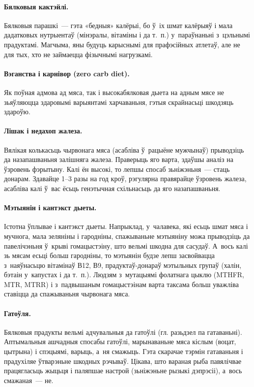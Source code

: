 
\paragraph{Бялковыя кактэйлі.}
Бялковыя парашкі~--- гэта «бедныя» калёрыі, бо ў~іх шмат калёрыяў і мала дадатковых нутрыентаў (мінэралы, вітаміны і да т.~п.) у~параўнаньні з~цэльнымі прадуктамі. Магчыма, яны будуць карыснымі для прафэсійных атлетаў, але не для тых, хто не займаецца фізычнымі нагрузкамі.

\paragraph{Вэганства і карнівор (zero carb diet).}
Як поўная адмова ад мяса, так і высокабялковая дыета на адным мясе не зьяўляюцца здаровымі варыянтамі харчаваньня, гэтыя скрайнасьці шкодзяць здароўю.

\paragraph{Лішак і недахоп жалеза.}
Вялікая колькасьць чырвонага мяса (асабліва ў~рацыёне мужчынаў) прыводзіць да назапашваньня залішняга жалеза. Праверыць яго варта, здаўшы аналіз на ўзровень фэрытыну. Калі ён высокі, то лепшы спосаб зьніжэньня~--- стаць донарам. Здавайце 1--3 разы на год кроў, рэгулярна правярайце ўзровень жалеза, асабліва калі ў~вас ёсьць генэтычная схільнасьць да яго назапашваньня.

\paragraph{Мэтыянін і кантэкст дыеты.}
Істотна ўплывае і кантэкст дыеты. Напрыклад, у~чалавека, які есьць шмат мяса і мучнога, мала зеляніны і гародніны, спажываньне мэтыяніну можа прыводзіць да павелічэньня ў~крыві гомацыстэіну, што вельмі шкодна для сасудаў. А~вось калі зь мясам есьці больш гародніны, то мэтыянін будзе лепш засвойвацца з~наяўнасьцю вітамінаў В12, В9, прадуктаў-донараў мэтыльных групаў (халін, бэтаін у~капустах і да т.~п.). Людзям з~мутацыямі фолатнага цыклю (MTHFR, MTR, MTRR) і з~падвышаным гомацыстэінам варта таксама больш уважліва ставіцца да спажываньня чырвонага мяса.

\paragraph{Гатоўля.}
Бялковыя прадукты вельмі адчувальныя да гатоўлі (гл. разьдзел па гатаваньні). Аптымальныя ашчадныя спосабы гатоўлі, марынаваньне мяса кіслым (воцат, цытрына) і спэцыямі, варыць, а~ня смажыць. Гэта скарачае тэрмін гатаваньня і прадухіляе ўтварэньне шкодных рэчываў. Цікава, што вараная рыба павялічвае працягласьць жыцьця і паляпшае настрой (зьніжэньне рызыкі дэпрэсіі), а~вось смажаная~--- не.

